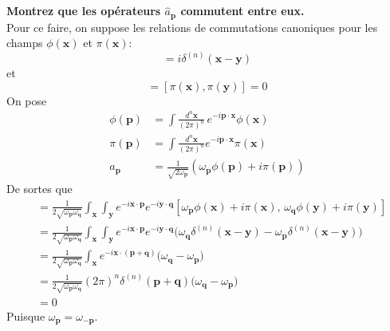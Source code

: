 \documentclass{article}
\numberwithin{equation}{section}
\begin{document}
\section{}
\subsection{}
\textbf{Montrez que les opérateurs $\hat{a}_\mathbf{p}$ commutent entre eux.} \\

Pour ce faire, on suppose les relations de commutations canoniques pour les champs $\phi(\mathbf{x})$ et $\pi(\mathbf{x})$:
\begin{equation}
        [\phi(\mathbf{x}), \pi(\mathbf{y})] = i\delta^{(n)}(\mathbf{x} - \mathbf{y})
\end{equation} 
et
\begin{equation}
        [\phi(\mathbf{x}), \phi(\mathbf{y})] = [\pi(\mathbf{x}), \pi(\mathbf{y})] = 0
\end{equation} 
On pose
\begin{align}
        \phi(\mathbf{p}) &= \int \frac{d^{n}\mathbf{x}}{(2\pi)^{n}}\, e^{-i \mathbf{p}\cdot \mathbf{x}} \phi(\mathbf{x}) \\
        \pi(\mathbf{p}) &= \int \frac{d^{n}\mathbf{x}}{(2\pi)^{n}} e^{-i \mathbf{p} \cdot \mathbf{x}} \pi(\mathbf{x}) \\
        a_{\mathbf{p}} &= \frac{1}{\sqrt{2 \omega_{\mathbf{p}}}}(\omega_{\mathbf{p}}\phi(\mathbf{p}) + i \pi(\mathbf{p}))
\end{align} 
De sortes que
\begin{align*}
        [a_{\mathbf{p}}, a_{\mathbf{q}}] &= 
        \frac{1}{2\sqrt{\omega_{\mathbf{p}} \omega_{\mathbf{q}}}}\int_{\mathbf{x}} \int_{\mathbf{y}}
        e^{-i \mathbf{x} \cdot \mathbf{p}}e^{-i \mathbf{y} \cdot \mathbf{q}}
[\omega_{\mathbf{p}} \phi(\mathbf{x}) + i \pi(\mathbf{x}),\, \omega_{\mathbf{q}} \phi(\mathbf{y}) + i \pi(\mathbf{y})] \\
        &= \frac{1}{2\sqrt{\omega_{\mathbf{p}} \omega_{\mathbf{q}}}}\int_{\mathbf{x}} \int_{\mathbf{y}}
        e^{-i \mathbf{x} \cdot \mathbf{p}}e^{-i \mathbf{y} \cdot \mathbf{q}}
        \big(
              \omega_{\mathbf{q}} \delta^{(n)}(\mathbf{x} - \mathbf{y}) -\omega_{\mathbf{p}} \delta^{(n)}(\mathbf{x} - \mathbf{y})
\big) \\
        &= \frac{1}{2\sqrt{\omega_{\mathbf{p}} \omega_{\mathbf{q}}}}\int_{\mathbf{x}}
        e^{-i\mathbf{x} \cdot( \mathbf{p} + \mathbf{q})} 
        \big(
              \omega_{\mathbf{q}} -\omega_{\mathbf{p}}
\big) \\
        &= \frac{1}{2\sqrt{\omega_{\mathbf{p}} \omega_{\mathbf{q}}}}
        (2\pi)^{n}\delta^{(n)}(\mathbf{p} + \mathbf{q})
        \big(
              \omega_{\mathbf{q}} -\omega_{\mathbf{p}}
\big) \\
&=  0
\end{align*}
Puisque $\omega_{\mathbf{p}} = \omega_{-\mathbf{p}}$.
\end{document}
